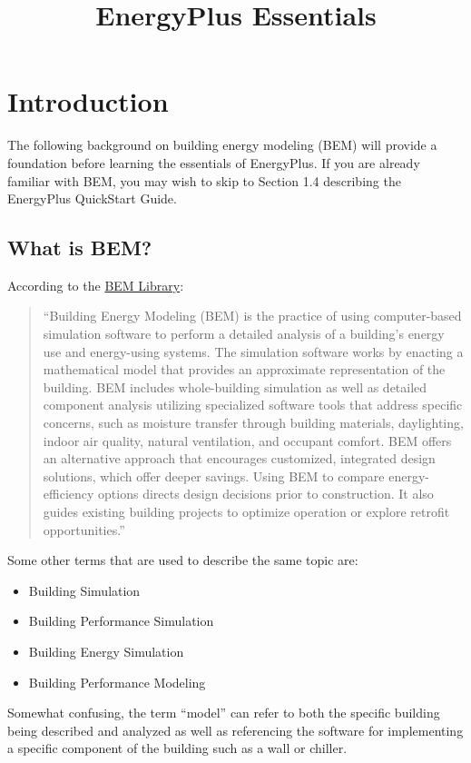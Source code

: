 

\title{EnergyPlus Essentials}






\chapter{Introduction}

The following background on building energy modeling (BEM) will provide
a foundation before learning the essentials of EnergyPlus. If you
are already familiar with BEM, you may wish to skip to Section 1.4
describing the EnergyPlus QuickStart Guide. 

\section{What is BEM?}

According to the \href{https://www.bemlibrary.com/index.php/owners-managers/introduction/what-bem/}{BEM Library}:
\begin{quotation}
``Building Energy Modeling (BEM) is the practice of using computer-based
simulation software to perform a detailed analysis of a building\textquoteright s
energy use and energy-using systems. The simulation software works
by enacting a mathematical model that provides an approximate representation
of the building. BEM includes whole-building simulation as well as
detailed component analysis utilizing specialized software tools that
address specific concerns, such as moisture transfer through building
materials, daylighting, indoor air quality, natural ventilation, and
occupant comfort. BEM offers an alternative approach that encourages
customized, integrated design solutions, which offer deeper savings.
Using BEM to compare energy-efficiency options directs design decisions
prior to construction. It also guides existing building projects to
optimize operation or explore retrofit opportunities.''
\end{quotation}
Some other terms that are used to describe the same topic are:
\begin{itemize}
\item Building Simulation
\item Building Performance Simulation
\item Building Energy Simulation
\item Building Performance Modeling
\end{itemize}
Somewhat confusing, the term ``model'' can refer to both the specific
building being described and analyzed as well as referencing the software
for implementing a specific component of the building such as a wall
or chiller.

